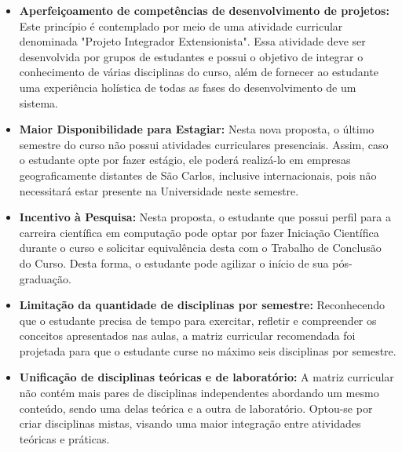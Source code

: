 \begin{itemize}
\item \textbf{Aperfeiçoamento de competências de desenvolvimento de projetos:} Este princípio é contemplado por meio de uma atividade curricular denominada "Projeto Integrador Extensionista". Essa atividade deve ser desenvolvida por grupos de estudantes e possui o objetivo de integrar o conhecimento de várias disciplinas do curso, além de fornecer ao estudante uma experiência holística de todas as fases do desenvolvimento de um sistema.

\item \textbf{Maior Disponibilidade para Estagiar:} Nesta nova proposta, o último semestre do curso não possui atividades curriculares presenciais. Assim, caso o estudante opte por fazer estágio, ele poderá realizá-lo em empresas geograficamente distantes de São Carlos, inclusive internacionais, pois não necessitará estar presente na Universidade neste semestre.

\item \textbf{Incentivo à Pesquisa:} Nesta proposta, o estudante que possui perfil para a carreira científica em computação pode optar por fazer  Iniciação Científica durante o curso e solicitar equivalência desta com o Trabalho de Conclusão do Curso. Desta forma, o estudante pode agilizar o início de sua pós-graduação.  

\item \textbf{Limitação da quantidade de disciplinas por semestre:} Reconhecendo que o estudante precisa de tempo para exercitar, refletir e compreender os conceitos apresentados nas aulas, a matriz curricular recomendada foi projetada para que o estudante curse no máximo seis disciplinas por semestre. 

\item \textbf{Unificação de disciplinas teóricas e de laboratório:} A matriz curricular não contém mais pares de disciplinas independentes abordando um mesmo conteúdo, sendo uma delas teórica e a outra de laboratório. Optou-se por criar disciplinas mistas, visando uma maior integração entre atividades teóricas e práticas.



\end{itemize}

